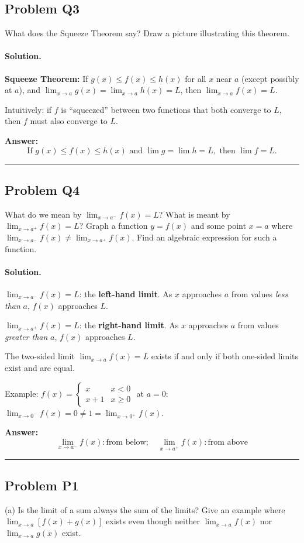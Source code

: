 \documentclass[12pt, a4paper]{article}
\newcommand{\problem}[1]{\subsection*{Problem #1}}
\newcommand{\solution}{\paragraph{Solution.}}
\begin{document}
\problem{Q3}

What does the Squeeze Theorem say? Draw a picture illustrating this theorem.

\solution

\textbf{Squeeze Theorem:} If $g(x) \le f(x) \le h(x)$ for all $x$ near $a$ (except possibly at $a$), and $\lim_{x \to a} g(x) = \lim_{x \to a} h(x) = L$, then $\lim_{x \to a} f(x) = L$.

Intuitively: if $f$ is ``squeezed'' between two functions that both converge to $L$, then $f$ must also converge to $L$.

\textbf{Answer:}
\[\boxed{\text{If } g(x) \le f(x) \le h(x) \text{ and } \lim g = \lim h = L, \text{ then } \lim f = L.}\]

\vspace{1em}
\hrule
\vspace{1em}

\problem{Q4}

What do we mean by $\lim_{x \to a^-} f(x) = L$? What is meant by $\lim_{x \to a^+} f(x) = L$? Graph a function $y = f(x)$ and some point $x = a$ where $\lim_{x \to a^-} f(x) \neq \lim_{x \to a^+} f(x)$. Find an algebraic expression for such a function.

\solution

$\lim_{x \to a^-} f(x) = L$: the \textbf{left-hand limit}. As $x$ approaches $a$ from values \emph{less than} $a$, $f(x)$ approaches $L$.

$\lim_{x \to a^+} f(x) = L$: the \textbf{right-hand limit}. As $x$ approaches $a$ from values \emph{greater than} $a$, $f(x)$ approaches $L$.

The two-sided limit $\lim_{x \to a} f(x) = L$ exists if and only if both one-sided limits exist and are equal.

Example: $f(x) = \begin{cases} x & x < 0 \\ x+1 & x \ge 0 \end{cases}$ at $a = 0$: $\lim_{x \to 0^-} f(x) = 0 \neq 1 = \lim_{x \to 0^+} f(x)$.

\textbf{Answer:}
\[\boxed{\lim_{x \to a^-} f(x): \text{from below}; \quad \lim_{x \to a^+} f(x): \text{from above}}\]

\vspace{1em}
\hrule
\vspace{1em}

\problem{P1}

(a) Is the limit of a sum always the sum of the limits? Give an example where $\lim_{x \to a}[f(x) + g(x)]$ exists even though neither $\lim_{x \to a} f(x)$ nor $\lim_{x \to a} g(x)$ exist.
\end{document}
